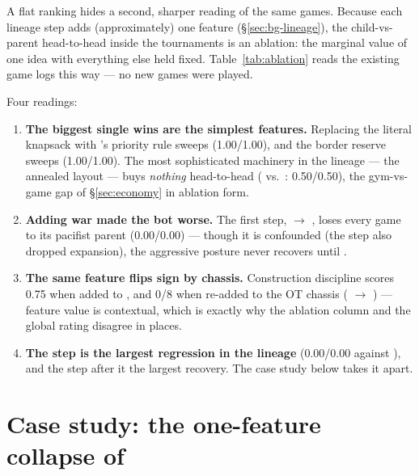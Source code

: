 A flat ranking hides a second, sharper reading of the same games. Because
each lineage step adds (approximately) one feature
(\S\ref{sec:bg-lineage}), the child-vs-parent head-to-head inside the
tournaments is an ablation: the marginal value of one idea with everything
else held fixed. Table~\ref{tab:ablation} reads the existing game logs this
way --- no new games were played.

\begin{table}[htbp]
\centering
{}
\caption{Each lineage step as an ablation: the child's head-to-head score
rate against its parent (4 games each per protocol) and the overall rating
gap. $\Delta$Elo magnitudes at the extremes are scale artifacts
(\S\ref{sec:elo-protocol}); the head-to-head columns are the honest
ablation signal.}
\label{tab:ablation}
\end{table}

Four readings:

\begin{enumerate}
  \item \textbf{The biggest single wins are the simplest features.}
    Replacing the literal knapsack with 's priority rule sweeps
    (1.00/1.00), and the border reserve sweeps (1.00/1.00). The most
    sophisticated machinery in the lineage --- the annealed layout ---
    buys \emph{nothing} head-to-head ( vs.\ :
    0.50/0.50), the gym-vs-game gap of \S\ref{sec:economy} in ablation
    form.
  \item \textbf{Adding war made the bot worse.} The first step,
     $\to$ , loses every game to its pacifist
    parent (0.00/0.00) --- though it is confounded (the step also dropped
    expansion), the aggressive posture never recovers until .
  \item \textbf{The same feature flips sign by chassis.} Construction
    discipline scores 0.75 when added to , and 0/8 when re-added
    to the OT chassis ( $\to$ ) --- feature value is
    contextual, which is exactly why the ablation column and the global
    rating disagree in places.
  \item \textbf{The  step is the largest regression in the
    lineage} (0.00/0.00 against ), and the step after it the
    largest recovery. The case study below takes it apart.
\end{enumerate}

\section{Case study: the one-feature collapse of }
\label{sec:elo-v11}

